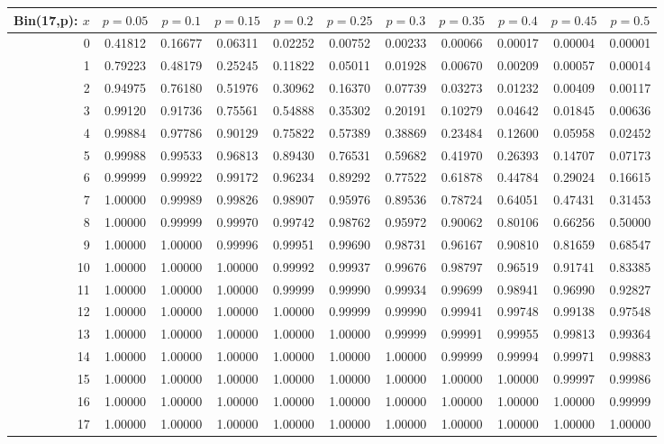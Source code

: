 \documentclass{article}
\begin{document}
{\vspace{8pt minus 6pt}
\begin{tabular}{@{\extracolsep{-2pt}}|r|c|c|c|c|c|c|c|c|c|c|}
\hline
Bin(17,p): $x$
   & $p\!=\!0.05$& $p\!=\!0.1$& $p\!=\!0.15$& $p\!=\!0.2$& $p\!=\!0.25$& $p\!=\!0.3$& $p\!=\!0.35$& $p\!=\!0.4$& $p\!=\!0.45$& $p\!=\!0.5$\\\hline
  0&0.41812&0.16677&0.06311&0.02252&0.00752&0.00233&0.00066&0.00017&0.00004&0.00001\\
  1&0.79223&0.48179&0.25245&0.11822&0.05011&0.01928&0.00670&0.00209&0.00057&0.00014\\
  2&0.94975&0.76180&0.51976&0.30962&0.16370&0.07739&0.03273&0.01232&0.00409&0.00117\\
  3&0.99120&0.91736&0.75561&0.54888&0.35302&0.20191&0.10279&0.04642&0.01845&0.00636\\
  4&0.99884&0.97786&0.90129&0.75822&0.57389&0.38869&0.23484&0.12600&0.05958&0.02452\\
  5&0.99988&0.99533&0.96813&0.89430&0.76531&0.59682&0.41970&0.26393&0.14707&0.07173\\
  6&0.99999&0.99922&0.99172&0.96234&0.89292&0.77522&0.61878&0.44784&0.29024&0.16615\\
  7&1.00000&0.99989&0.99826&0.98907&0.95976&0.89536&0.78724&0.64051&0.47431&0.31453\\
  8&1.00000&0.99999&0.99970&0.99742&0.98762&0.95972&0.90062&0.80106&0.66256&0.50000\\
  9&1.00000&1.00000&0.99996&0.99951&0.99690&0.98731&0.96167&0.90810&0.81659&0.68547\\
 10&1.00000&1.00000&1.00000&0.99992&0.99937&0.99676&0.98797&0.96519&0.91741&0.83385\\
 11&1.00000&1.00000&1.00000&0.99999&0.99990&0.99934&0.99699&0.98941&0.96990&0.92827\\
 12&1.00000&1.00000&1.00000&1.00000&0.99999&0.99990&0.99941&0.99748&0.99138&0.97548\\
 13&1.00000&1.00000&1.00000&1.00000&1.00000&0.99999&0.99991&0.99955&0.99813&0.99364\\
 14&1.00000&1.00000&1.00000&1.00000&1.00000&1.00000&0.99999&0.99994&0.99971&0.99883\\
 15&1.00000&1.00000&1.00000&1.00000&1.00000&1.00000&1.00000&1.00000&0.99997&0.99986\\
 16&1.00000&1.00000&1.00000&1.00000&1.00000&1.00000&1.00000&1.00000&1.00000&0.99999\\
 17&1.00000&1.00000&1.00000&1.00000&1.00000&1.00000&1.00000&1.00000&1.00000&1.00000\\
\hline
\end{tabular}

}
\end{document}
